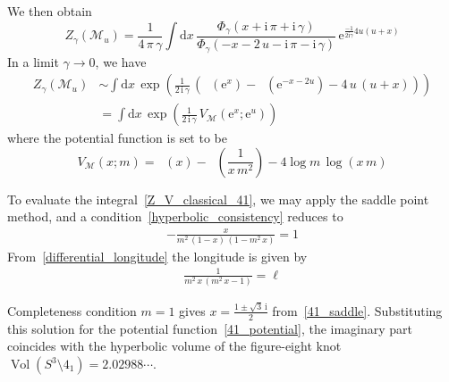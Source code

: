 \documentclass[12pt,reqno]{amsart}
\numberwithin{equation}{section}
\DeclareMathOperator{\Li}{Li_2}
\DeclareMathOperator{\Vol}{Vol}
\newcommand{\I}{\mathrm{i}}
\newcommand{\E}{\mathrm{e}}
\begin{document}
We then obtain
  \begin{equation}
    Z_\gamma\left( \mathcal{M}_u \right)
    =
    \frac{1}{ 4 \, \pi \, \gamma}
    \int \mathrm{d} x \,
    \frac{
      \Phi_\gamma(x+ \I \, \pi + \I \, \gamma)
    }{
      \Phi_\gamma(-x-  2 \, u - \I \, \pi - \I \, \gamma)
    } \,
    \E^{\frac{-1}{2 \I \gamma} 4 u(u +x)}
  \end{equation}
  In a limit $\gamma \to 0$, we have
  \begin{align}
    Z_\gamma(\mathcal{M}_u)
    & \sim
    \int \mathrm{d} x \, 
    \exp
    \left(
      \frac{1}{2 \, \I \, \gamma} \,
      \left(
        \Li(\E^x) - \Li(\E^{-x- 2 u}) -  4 \, u \, (u+ x)
      \right)
    \right)
    \nonumber \\
    & =
    \int \mathrm{d}x \,
    \exp \left( \frac{1}{2 \, \I \, \gamma} \,
      V_{\mathcal{M}}( \E^x ; \E^u) \right)
    \label{Z_V_classical_41}
  \end{align}
  where the potential function is set to be
  \begin{equation}
    \label{41_potential}
    V_{\mathcal{M}}(x; m)
    =
    \Li(x) - \Li \left(\frac{1}{x \, m^2 }\right)
    -4   \log m \,   \log (x \, m)
  \end{equation}
  
  To evaluate the integral~\eqref{Z_V_classical_41}, we may apply the
  saddle point method, and a condition~\eqref{hyperbolic_consistency}
  reduces to
  \begin{gather}
    \label{41_saddle}
    - \frac{x}{m^2 \, (1-x) \, (1-m^2 \, x)} = 1
  \end{gather}
  From~\eqref{differential_longitude} the longitude is given by
  \begin{gather}
    \label{41_long}
    \frac{1}{m^2 \, x \, (m^2 \, x - 1)}
    =
    \ell
  \end{gather}

  Completeness condition $m=1$ gives
  $x=\frac{1 \pm \sqrt{3} \, \I}{2}$ from~\eqref{41_saddle}.
  Substituting this solution for the potential
  function~\eqref{41_potential},
  the imaginary part coincides with
  the hyperbolic volume of the figure-eight knot
  $\Vol(S^3 \setminus 4_1)
  = 2.02988 \cdots$.
\end{document}
